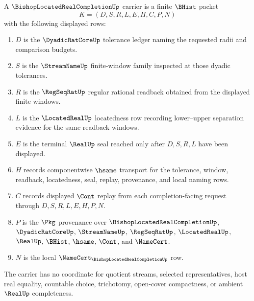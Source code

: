\begin{definition}
\label{def:bishop-located-real-completion-carrier}
A $\BishopLocatedRealCompletionUp$ carrier is a finite $\BHist$ packet
$$
K=(D,S,R,L,E,H,C,P,N)
$$
with the following displayed rows:
\begin{enumerate}
\item $D$ is the $\DyadicRatCoreUp$ tolerance ledger naming the requested radii and comparison budgets.
\item $S$ is the $\StreamNameUp$ finite-window family inspected at those dyadic tolerances.
\item $R$ is the $\RegSeqRatUp$ regular rational readback obtained from the displayed finite windows.
\item $L$ is the $\LocatedRealUp$ locatedness row recording lower--upper separation evidence for the same readback windows.
\item $E$ is the terminal $\RealUp$ seal reached only after $D,S,R,L$ have been displayed.
\item $H$ records componentwise $\hsame$ transport for the tolerance, window, readback, locatedness, seal, replay, provenance, and local naming rows.
\item $C$ records displayed $\Cont$ replay from each completion-facing request through $D,S,R,L,E,H,P,N$.
\item $P$ is the $\Pkg$ provenance over $\BishopLocatedRealCompletionUp$, $\DyadicRatCoreUp$, $\StreamNameUp$, $\RegSeqRatUp$, $\LocatedRealUp$, $\RealUp$, $\BHist$, $\hsame$, $\Cont$, and $\NameCert$.
\item $N$ is the local $\NameCert_{\BishopLocatedRealCompletionUp}$ row.
\end{enumerate}
The carrier has no coordinate for quotient streams, selected representatives, host real equality, countable choice, trichotomy, open-cover compactness, or ambient $\RealUp$ completeness.
\end{definition}


